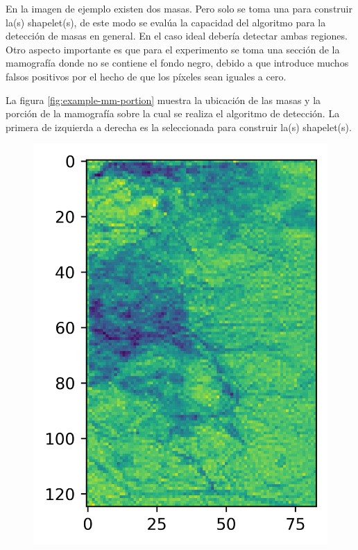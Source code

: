 En la imagen de ejemplo existen dos masas. Pero solo se toma una para construir la(s) shapelet(s), de este modo 
se evalúa la capacidad del algoritmo para la detección de masas en general. En el caso ideal debería detectar ambas
regiones. Otro aspecto importante es que para el experimento se toma una sección de la mamografía donde no se contiene
el fondo negro, debido a que introduce muchos falsos positivos por el hecho de que los píxeles sean iguales a
cero. 

La figura \ref{fig:example-mm-portion} muestra la ubicación de las masas y la porción de la mamografía sobre
la cual se realiza el algoritmo de detección. La primera de izquierda a derecha es la seleccionada para construir
la(s) shapelet(s).

\begin{figure}
\begin{multicols}{2}
    \includegraphics[width=\linewidth]{Graphics/mm-aprox.png}\par 

\end{multicols}
\end{figure}
